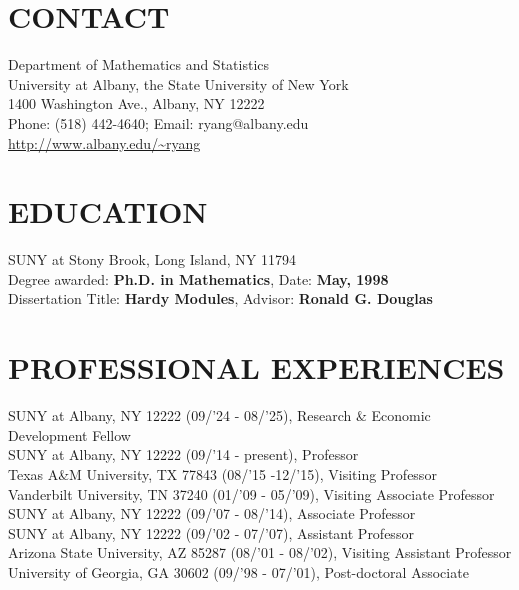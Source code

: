 \documentclass[12pt]{res} %
\begin{document}
 
 

\vspace{15mm} 
 
 
                                             
\begin{resume}
                                               
 \section{CONTACT}
\vspace{5mm}

\noindent Department of Mathematics and Statistics\\
University at Albany, the State University of New York\\
1400 Washington Ave., Albany, NY 12222\\
Phone: (518) 442-4640;  Email: ryang@albany.edu\\
\url{http://www.albany.edu/~ryang}\\


\section{EDUCATION}

\vspace{5mm} 

 \noindent SUNY at Stony Brook, Long Island, NY 11794 \\
Degree awarded: \textbf{Ph.D. in Mathematics}, Date: \textbf{May, 1998}\\
Dissertation Title: \textbf{Hardy Modules}, Advisor: \textbf{Ronald G. Douglas}
 
\section{PROFESSIONAL EXPERIENCES} 

\vspace{5mm} 

{SUNY at Albany, NY 12222} (09/'24 - 08/'25), Research \& Economic Development Fellow\\
{SUNY at Albany, NY 12222} (09/'14 - present), Professor\\
{Texas A\&M University, TX 77843} (08/'15 -12/'15), Visiting Professor\\
{Vanderbilt University, TN 37240} (01/'09 - 05/'09), Visiting Associate Professor\\
{SUNY at Albany, NY 12222} (09/'07 - 08/'14), Associate Professor\\
{SUNY at Albany, NY 12222} (09/'02 - 07/'07), Assistant Professor\\
{Arizona State University, AZ 85287} (08/'01 - 08/'02), Visiting Assistant Professor\\
{University of Georgia, GA 30602} (09/'98 - 07/'01), Post-doctoral Associate


\end{resume}
\end{document}
